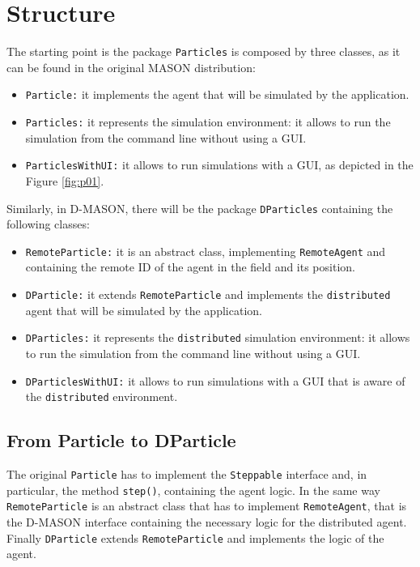 \documentclass{book}
\begin{document}
\chapter{Structure}
The starting point is the package \texttt{Particles} is composed by three classes, as it can be found in the original MASON distribution:

\begin{itemize}
	\item \texttt{Particle:} it implements the agent that will be simulated by the application.
	\item \texttt{Particles:} it represents the simulation environment: it allows to run the simulation from the command line without using a GUI.
	\item \texttt{ParticlesWithUI:} it allows to run simulations with a GUI, as depicted in the Figure \ref{fig:p01}.
\end{itemize}

Similarly, in D-MASON, there will be the package \texttt{DParticles} containing the following classes:
\begin{itemize}
	\item \texttt{RemoteParticle:} it is an abstract class, implementing \texttt{RemoteAgent} and containing the remote ID of the agent in the field and its position. 
	\item \texttt{DParticle:} it extends \texttt{RemoteParticle} and implements the \texttt{distributed} agent that will be simulated by the application.
	\item \texttt{DParticles:} it represents the \texttt{distributed} simulation environment: it allows to run the simulation from the command line without using a GUI.
	\item \texttt{DParticlesWithUI:} it allows to run simulations with a GUI that is aware of the \texttt{distributed} environment.
\end{itemize}

\section{From Particle to DParticle}
The original \texttt{Particle} has to implement the \texttt{Steppable} interface and, in particular, the method \texttt{step()}, containing the agent logic. In the same way \texttt{RemoteParticle} is an abstract class that has to implement \texttt{RemoteAgent}, that is the D-MASON interface containing the necessary logic for the distributed agent. Finally \texttt{DParticle} extends \texttt{RemoteParticle} and implements the logic of the agent.
\end{document}
